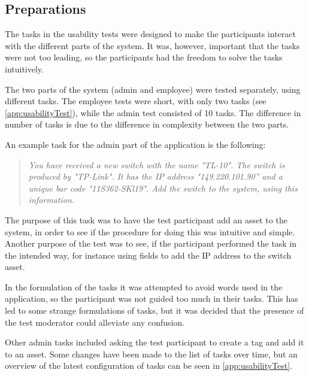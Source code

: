 \subsection{Preparations}
The tasks in the usability tests were designed to make the participants interact with the different parts of the system. It was, however, important that the tasks were not too leading, so the participants had the freedom to solve the tasks intuitively. 
\par
The two parts of the system (admin and employee) were tested separately, using different tasks. The employee tests were short, with only two tasks (see \autoref{app:usabilityTest}), while the admin test consisted of 10 tasks. The difference in number of tasks is due to the difference in complexity between the two parts. 
\par
An example task for the admin part of the application is the following:

\begin{quote}
\textit{You have received a new switch with the name "TL-10". The switch is produced by "TP-Link". It has the IP address "149.220.101.90” and a unique bar code "11S362-SKl19". Add the switch to the system, using this information.}
\end{quote}

The purpose of this task was to have the test participant add an asset to the system, in order to see if the procedure for doing this was intuitive and simple. Another purpose of the test was to see, if the participant performed the task in the intended way, for instance using fields to add the IP address to the switch asset.
\par 
In the formulation of the tasks it was attempted to avoid words used in the application, so the participant was not guided too much in their tasks. This has led to some strange formulations of tasks, but it was decided that the presence of the test moderator could alleviate any confusion.
\par
Other admin tasks included asking the test participant to create a tag and add it to an asset. Some changes have been made to the list of tasks over time, but an overview of the latest configuration of tasks can be seen in \autoref{app:usabilityTest}. 


